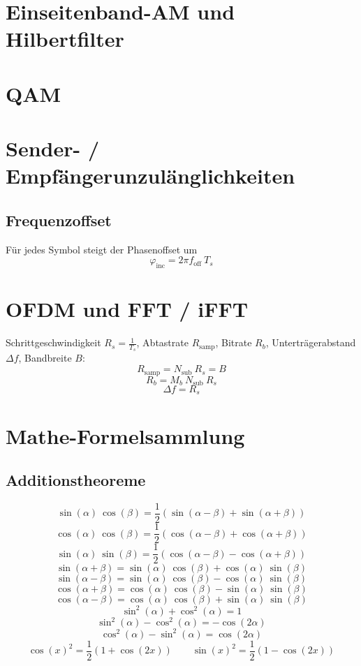 \documentclass[a4paper, 11pt]{article}
\begin{document}
\section*{Einseitenband-AM und Hilbertfilter}
\section*{QAM}
\section*{Sender- / Empfängerunzulänglichkeiten}
\subsection*{Frequenzoffset}
Für jedes Symbol steigt der Phasenoffset um
\[
	\varphi_{\mathrm{inc}} = 2 \pi f_{\mathrm{off}} ~ T_s
\]

\section*{OFDM und FFT / iFFT}
Schrittgeschwindigkeit $R_s = \frac{1}{T_s}$, Abtastrate $R_{\mathrm{samp}}$, Bitrate $R_b$, Unterträgerabstand $\Delta f$, Bandbreite $B$:
\[
	R_{\mathrm{samp}} = N_{\mathrm{sub}} ~ R_s = B
\]
\[
	R_b = M_b ~ N_{\mathrm{sub}} ~ R_s
\]
\[
	\Delta f = R_s
\]


\section*{Mathe-Formelsammlung}
\subsection*{Additionstheoreme}
\[ \sin(\alpha) ~ \cos(\beta) = \frac{1}{2} (\sin(\alpha - \beta) + \sin(\alpha + \beta)) \]
\[ \cos(\alpha) ~ \cos(\beta) = \frac{1}{2} (\cos(\alpha - \beta) + \cos(\alpha + \beta)) \]
\[ \sin(\alpha) ~ \sin(\beta) = \frac{1}{2} (\cos(\alpha - \beta) - \cos(\alpha + \beta)) \]
\vspace{0.5pt}
\[ \sin(\alpha + \beta) = \sin(\alpha) ~ \cos(\beta) + \cos(\alpha) ~ \sin(\beta) \]
\[ \sin(\alpha - \beta) = \sin(\alpha) ~ \cos(\beta) - \cos(\alpha) ~ \sin(\beta) \]
\[ \cos(\alpha + \beta) = \cos(\alpha) ~ \cos(\beta) - \sin(\alpha) ~ \sin(\beta) \]
\[ \cos(\alpha - \beta) = \cos(\alpha) ~ \cos(\beta) + \sin(\alpha) ~ \sin(\beta) \]
\vspace{0.5pt}
\[ \sin^2(\alpha) + \cos^2(\alpha) = 1 \]
\[ \sin^2(\alpha) - \cos^2(\alpha) = -\cos(2\alpha) \]
\[ \cos^2(\alpha) - \sin^2(\alpha) = \cos(2\alpha) \]
\[ \cos(x)^2 = \frac{1}{2} \left(1 + \cos(2x) \right) \qquad \sin(x)^2 = \frac{1}{2} \left(1 - \cos(2x) \right) \]

\end{document}
